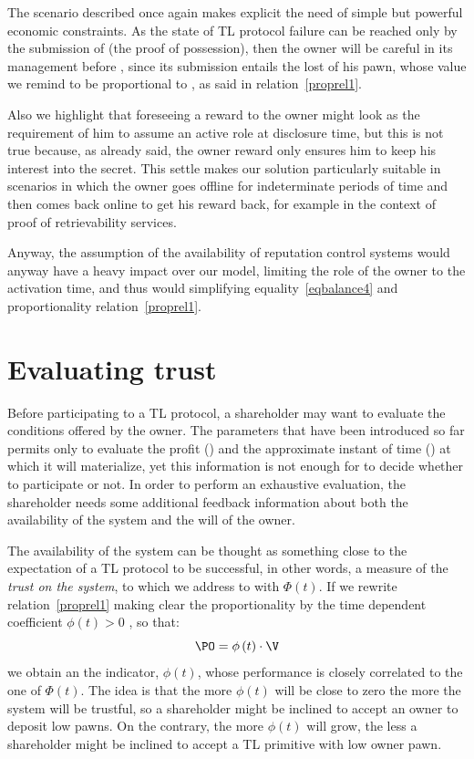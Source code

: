 The scenario described once again makes explicit the need of simple but powerful economic constraints. As the state of TL protocol failure can be reached only by the submission of \secret (the proof of possession), then the owner will be careful in its management before \td, since its submission entails the lost of his pawn, whose value we remind to be proportional to \secret, as said in relation~\ref{proprel1}.

Also we highlight that foreseeing a reward to the owner might look as the requirement of him to assume an active role at disclosure time, but this is not true because, as already said, the owner reward only ensures him to keep his interest into the secret. This settle makes our solution particularly suitable in scenarios in which the owner goes offline for indeterminate periods of time and then comes back online to get his reward back, for example in the context of proof of retrievability services.

Anyway, the assumption of the availability of reputation control systems would anyway have a heavy impact over our model, limiting the role of the owner to the activation time, and thus would simplifying equality~\ref{eqbalance4} and proportionality relation~\ref{proprel1}.

\section{Evaluating trust}

Before participating to a TL protocol, a shareholder may want to evaluate the conditions offered by the owner. The parameters that have been introduced so far permits only to evaluate the profit (\profit) and the approximate instant of time (\td) at which it will materialize, yet this information is not enough for \shareholder to decide whether to participate or not.
In order to perform an exhaustive evaluation, the shareholder needs some additional feedback information about both the availability of the system and the will of the owner. 

The availability of the system can be thought as something close to the expectation of a TL protocol to be successful, in other words, a measure of the {\em trust on the system}, to which we address to with $\Phi \left( t \right)$. 
If we rewrite relation~\ref{proprel1} making clear the proportionality by the time dependent coefficient $\phi \left( t \right) > 0$ , so that:
\begin{equation}\label{proprel2}
\PO = \phi \left( t \right) \cdot \V
\end{equation} 
we obtain an the indicator, $\phi \left( t \right)$, whose performance is closely correlated to the one of $\Phi \left( t \right)$. The idea is that the more $\phi \left( t \right)$ will be close to zero the more the system will be trustful, so a shareholder might be inclined to accept an owner to deposit low pawns. On the contrary, the more $\phi \left( t \right)$ will grow, the less a shareholder might be inclined to accept a TL primitive with low owner pawn. 

